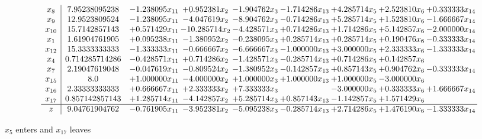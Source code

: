 \documentclass[10pt]{article}
\begin{document}
 \[\begin{array}{c| c c@{\hskip 2pt} c@{\hskip 2pt} c@{\hskip 2pt} c@{\hskip 2pt} c@{\hskip 2pt} c@{\hskip 2pt} c@{\hskip 2pt} }
 x_{8}   &  7.95238095238 & -1.238095 x_{11} & + 0.952381 x_{2} & -1.904762 x_{3} & -1.714286 x_{13} & + 4.285714 x_{5} & + 2.523810 x_{6} & + 0.333333 x_{14}\\
 x_{9}   &  12.9523809524 & -1.238095 x_{11} & -4.047619 x_{2} & -8.904762 x_{3} & -0.714286 x_{13} & + 5.285714 x_{5} & + 1.523810 x_{6} & -1.666667 x_{14}\\
 x_{10}   &  15.7142857143 & + 0.571429 x_{11} & -10.285714 x_{2} & -4.428571 x_{3} & + 0.714286 x_{13} & + 1.714286 x_{5} & + 5.142857 x_{6} & -2.000000 x_{14}\\
 x_{1}   &  1.61904761905 & + 0.095238 x_{11} & -1.380952 x_{2} & -0.238095 x_{3} & + 0.285714 x_{13} & + 0.285714 x_{5} & + 0.190476 x_{6} & -0.333333 x_{14}\\
 x_{12}   &  15.3333333333 & -1.333333 x_{11} & -0.666667 x_{2} & -6.666667 x_{3} & -1.000000 x_{13} & + 3.000000 x_{5} & + 2.333333 x_{6} & -1.333333 x_{14}\\
 x_{4}   &  0.714285714286 & -0.428571 x_{11} & + 0.714286 x_{2} & -1.428571 x_{3} & -0.285714 x_{13} & + 0.714286 x_{5} & + 0.142857 x_{6} &   \\
 x_{7}   &  2.19047619048 & -0.047619 x_{11} & -0.809524 x_{2} & -1.380952 x_{3} & -0.142857 x_{13} & + 0.857143 x_{5} & + 0.904762 x_{6} & -0.333333 x_{14}\\
 x_{15}   &  8.0 & + 1.000000 x_{11} & -4.000000 x_{2} & + 1.000000 x_{3} & + 1.000000 x_{13} & + 1.000000 x_{5} & -3.000000 x_{6} &   \\
 x_{16}   &  2.33333333333 & + 0.666667 x_{11} & + 2.333333 x_{2} & + 7.333333 x_{3} &   & -3.000000 x_{5} & + 0.333333 x_{6} & + 1.666667 x_{14}\\
 x_{17}   &  0.857142857143 & + 1.285714 x_{11} & -4.142857 x_{2} & + 5.285714 x_{3} & + 0.857143 x_{13} & -1.142857 x_{5} & + 1.571429 x_{6} &   \\
\hline
z    &  9.04761904762 & -0.761905 x_{11} & -3.952381 x_{2} & -5.095238 x_{3} & -0.285714 x_{13} & + 2.714286 x_{5} & + 1.476190 x_{6} & -1.333333 x_{14}\\
\end{array}\]


 $ x_{5} $ enters and $ x_{17} $ leaves 
\end{document}
